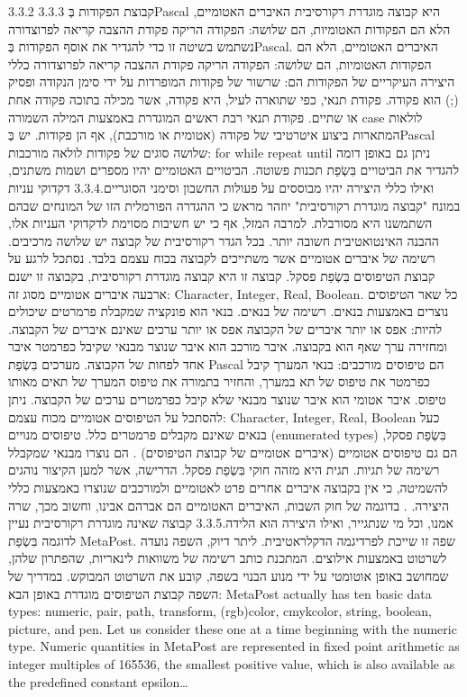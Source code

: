 {3.3.2
​3.3.3​ קבוצת הפקודות בְּPascal היא קבוצה מוגדרת רקורסיבית
האיברים האטומיים, הלא הם הפקודות האטומיות, הם שלושה:
הפקודה הריקה
פקודת ההצבה
קריאה לפרוצדורה
נשתמש בשיטה זו כדי להגדיר את אוסף הפקודות בְּPascal. האיברים האטומיים, הלא הם הפקודות האטומיות, הם שלושה:
הפקודה הריקה
פקודת ההצבה
קריאה לפרוצדורה
כללי היצירה העיקריים של הפקודות הם:
שרשור של פקודות המופרדות על ידי סימן הנקודה ופסיק (;) הוא פקודה.
פקודת תנאי, כפי שתוארה לעיל, היא פקודה, אשר מכילה בתוכה פקודה אחת או שתיים.
פקודת תנאי רבת ראשים המוגדרת באמצעות המילה השמורה case
לולאות המתארות ביצוע איטרטיבי של פקודה (אטומית או מורכבת), אף הן פקודות. יש בְּPascal שלושה סוגים של פקודות לולאה מורכבות:
for
while
repeat until
ניתן גם באופן דומה להגדיר את הביטויים בִּשְׂפַת תכנות פשוטה. הביטויים האטומיים יהיו מספרים ושמות משתנים, ואילו כללי היצירה יהיו מבוססים על פעולות החשבון וסימני הסוגריים.
​3.3.4​ דקדוקי עניות במונח "קבוצה מוגדרת רקורסיבית"
יוזהר מראש כי ההגדרה הפורמלית הזו של המונחים שבהם השתמשנו היא מסורבלת. למרבה המזל, אף כי יש חשיבות מסוימת לדקדוקי העניות אלו, ההבנה האינטואטיבית חשובה יותר.
בכל הגדר רקורסיבית של קבוצה יש שלושה מרכיבים.
רשימה של איברים אטומיים אשר משתייכים לקבוצה בכוח עצמם בלבד.
נסתכל לרגע על קבוצת הטיפוסים בִּשְׂפַת פסקל. קבוצה זו היא קבוצה מוגדרת רקורסיבית, בקבוצה זו ישנם ארבעה איברים אטומיים מסוג זה: Character, Integer, Real, Boolean. כל שאר הטיפוסים נוצרים באמצעות בנאים.
רשימה של בנאים.
בנאי הוא פונקציה שמקבלת פרמרטים שיכולים להיות:
אפס או יותר איברים של הקבוצה
אפס או יותר ערכים שאינם איברים של הקבוצה.
ומחזירה ערך שאף הוא בקבוצה.
איבר מורכב הוא איבר שנוצר מבנאי שקיבל כפרמטר איבר אחד לפחות של הקבוצה.
מערכים בִּשְׂפַת Pascal הם טיפוסים מורכבים: בנאי המערך קיבל כפרמטר את טיפוס של תא במערך, והחזיר בתמורה את טיפוס המערך של תאים מאותו טיפוס.
איבר אטומי הוא איבר שנוצר מבנאי שלא קיבל כפרמטרים ערכים של הקבוצה.
ניתן להסתכל על הטיפוסים אטומיים מכוח עצמם: Character, Integer, Real, Boolean כעל בנאים שאינם מקבלים פרמטרים כלל.
טיפוסים מנויים (enumerated types) בִּשְׂפַת פסקל, הם גם טיפוסים אטומיים (איברים אטומיים של קבוצת הטיפוסים) . הם נוצרו מבנאי שמקבלל רשימה של תגיות. תגית היא מזהה חוקי בִּשְׂפַת פסקל.
הדרישה, אשר למען הקיצור נוהגים להשמיטה, כי אין בקבוצה איברים אחרים פרט לאטומיים ולמורכבים שנוצרו באמצעות כללי היצירה. .
בדוגמה של חוק השבות, האיברים האטומיים הם אברהם אבינו, וחשוב מכך, שרה אמנו, וכל מי שנתגייר, ואילו היצירה הוא הלידה.
​3.3.5​ קבוצה שאינה מוגדרת רקורסיבית
נעיין לדוגמה בִּשְׂפַת MetaPost. שפה זו שייכת לפרדיגמה הדקלראטיבית. ליתר דיוק, השפה נועדה לשרטוט באמצעות אילוצים. המתכנת כותב רשימה של משוואות לינאריות, שהפתרון שלהן, שמחושב באופן אוטומטי על ידי מנוע הבנוי בשפה, קובע את השרטוט המבוקש.
במדריך של השפה קבוצת הטיפוסים מוגדרת באופן הבא:
MetaPost actually has ten basic data types: numeric, pair, path, transform, (rgb)color, cmykcolor, string, boolean, picture, and pen. Let us consider these one at a time beginning with the numeric type.
Numeric quantities in MetaPost are represented in fixed point arithmetic as
integer multiples of 165536, the smallest positive value, which is also
available as the predefined constant epsilon…

}
